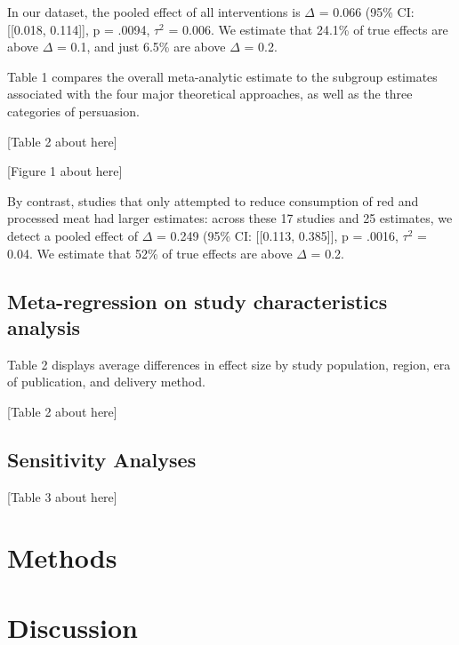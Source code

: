 \documentclass[sn-nature,referee,pdflatex]{sn-jnl}
\begin{document}
In our dataset, the pooled effect of all interventions is \(\Delta\) =
0.066 (95\% CI: {[}{[}0.018, 0.114{]}{]}, p = .0094, \(\tau^2\) = 0.006.
We estimate that 24.1\% of true effects are above \(\Delta\) = 0.1, and
just 6.5\% are above \(\Delta\) = 0.2.

Table 1 compares the overall meta-analytic estimate to the subgroup
estimates associated with the four major theoretical approaches, as well
as the three categories of persuasion.

\begin{center}
[Table 2 about here]
\end{center}

\begin{center}
[Figure 1 about here]
\end{center}

By contrast, studies that only attempted to reduce consumption of red
and processed meat had larger estimates: across these 17 studies and 25
estimates, we detect a pooled effect of \(\Delta\) = 0.249 (95\% CI:
{[}{[}0.113, 0.385{]}{]}, p = .0016, \(\tau^2\) = 0.04. We estimate that
52\% of true effects are above \(\Delta\) = 0.2.

\subsection{Meta-regression on study characteristics
analysis}\label{meta-regression-on-study-characteristics-analysis}

Table 2 displays average differences in effect size by study population,
region, era of publication, and delivery method.

\begin{center}
[Table 2 about here]
\end{center}

\subsection{Sensitivity Analyses}\label{sensitivity-analyses}

\begin{center}
[Table 3 about here]
\end{center}

\section{Methods}\label{sec3}

\section{Discussion}\label{discussion}
\end{document}
